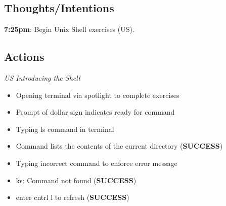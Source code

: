 \documentclass{article}
\begin{document}
\subsection{Thoughts/Intentions}
\textbf{7:25pm}: Begin Unix Shell exercises (US). 

\subsection{Actions}
\textit{US Introducing the Shell}
\begin{itemize}
\item Opening terminal via spotlight to complete exercises
\item Prompt of dollar sign indicates ready for command
\item Typing ls command in terminal
\item Command lists the contents of the current directory (\textbf{SUCCESS})
\item Typing incorrect command to enforce error message
\item ks: Command not found (\textbf{SUCCESS})
\item enter cntrl l to refresh (\textbf{SUCCESS})
\end{itemize}
\end{document}

